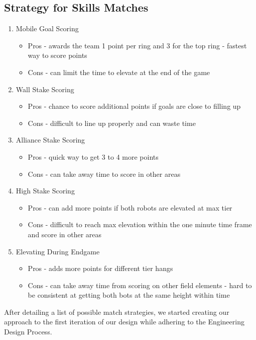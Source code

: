 \subsection{Strategy for Skills Matches}
\begin{enumerate} 

    \item Mobile Goal Scoring
    \begin{itemize}
    \item Pros
    \subitem - awards the team 1 point per ring and 3 for the top ring
    \subitem - fastest way to score points
    \item Cons
    \subitem - can limit the time to elevate at the end of the game
    \end{itemize}
    \item Wall Stake Scoring
    \begin{itemize}
    \item Pros
    \subitem - chance to score additional points if goals are close to filling up
    \item Cons
    \subitem - difficult to line up properly and can waste time
    \end{itemize}
    \item Alliance Stake Scoring
    \begin{itemize}
    \item Pros
    \subitem - quick way to get 3 to 4 more points
    \item Cons
    \subitem - can take away time to score in other areas
    \end{itemize} 
    \item High Stake Scoring 
    \begin{itemize}
    \item Pros
    \subitem - can add more points if both robots are elevated at max tier
    \item Cons
    \subitem - difficult to reach max elevation within the one minute time frame and score in other areas
    \end{itemize}
    \item Elevating During Endgame
    \begin{itemize}
    \item Pros
    \subitem - adds more points for different tier hangs
    \item Cons
    \subitem - can take away time from scoring on other field elements
    \subitem - hard to be consistent at getting both bots at the same height within time
    \end{itemize}
\end{enumerate}


After detailing a list of possible match strategies, we started creating our approach to the first iteration of our design while adhering to the Engineering Design Process.
